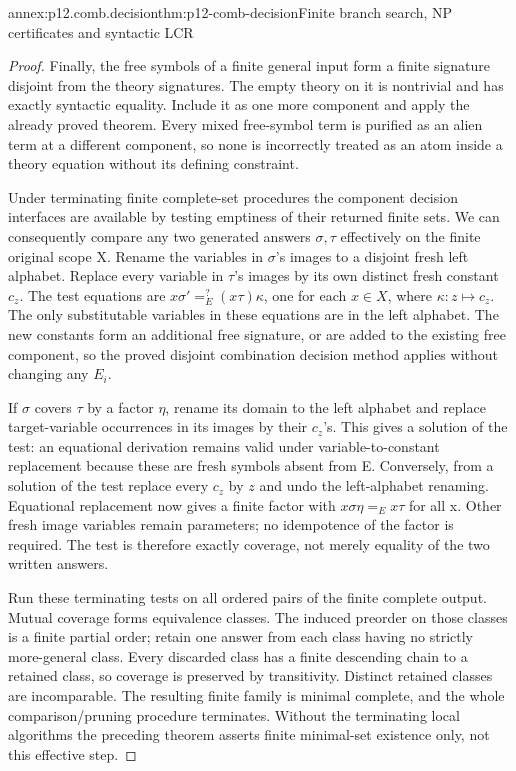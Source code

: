 \begin{annexitem}{annex:p12.comb.decision}{thm:p12-comb-decision}{Finite branch search, NP certificates and syntactic LCR}
\begin{proof}
Finally, the free symbols of a finite general input form a finite
signature disjoint from the theory signatures. The empty theory
on it is nontrivial and has exactly syntactic equality. Include
it as one more component and apply the already proved theorem.
Every mixed free-symbol term is purified as an alien term at a
different component, so none is incorrectly treated as an atom
inside a theory equation without its defining constraint.

Under terminating finite complete-set procedures the component
decision interfaces are available by testing emptiness of their
returned finite sets. We can consequently compare any two generated
answers \(\sigma,\tau\) effectively on the finite original scope X.
Rename the variables in \(\sigma\)'s images to a disjoint fresh
left alphabet. Replace every variable in \(\tau\)'s images by
its own distinct fresh constant \(c_z\). The test equations are
\(x\sigma'=^{?}_E(x\tau)\kappa\), one for each \(x\in X\),
where \(\kappa:z\mapsto c_z\). The only substitutable variables
in these equations are in the left alphabet. The new constants
form an additional free signature, or are added to the existing
free component, so the proved disjoint combination decision method
applies without changing any \(E_i\).

If \(\sigma\) covers \(\tau\) by a factor \(\eta\), rename its
domain to the left alphabet and replace target-variable occurrences
in its images by their \(c_z\)'s. This gives a solution of the test:
an equational derivation remains valid under variable-to-constant
replacement because these are fresh symbols absent from E.
Conversely, from a solution of the test replace every \(c_z\) by \(z\)
and undo the left-alphabet renaming. Equational replacement now
gives a finite factor with \(x\sigma\eta=_Ex\tau\) for all x.
Other fresh image variables remain parameters; no idempotence of
the factor is required. The test is therefore exactly coverage,
not merely equality of the two written answers.

Run these terminating tests on all ordered pairs of the finite
complete output. Mutual coverage forms equivalence classes. The
induced preorder on those classes is a finite partial order; retain
one answer from each class having no strictly more-general class.
Every discarded class has a finite descending chain to a retained
class, so coverage is preserved by transitivity. Distinct retained
classes are incomparable. The resulting finite family is minimal
complete, and the whole comparison/pruning procedure terminates.
Without the terminating local algorithms the preceding theorem
asserts finite minimal-set existence only, not this effective step.
\end{proof}
\end{annexitem}
